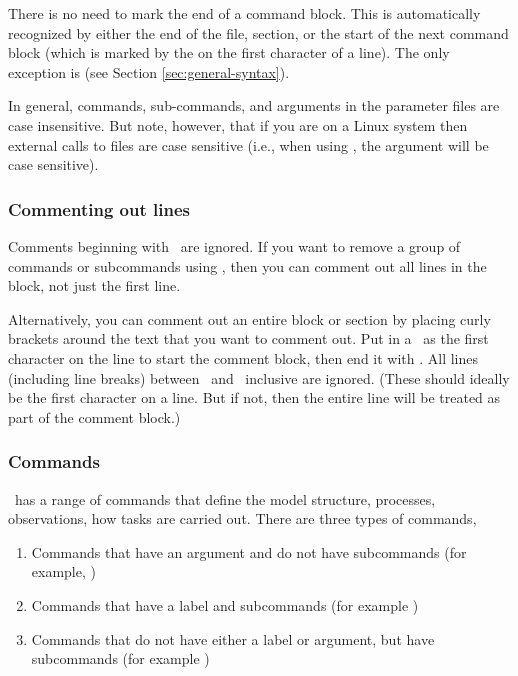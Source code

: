 There is no need to mark the end of a command block. This is automatically recognized by either the end of the file, section, or the start of the next command block (which is marked by the \command{} on the first character of a line). The only exception is  (see Section \ref{sec:general-syntax}). 

In general, commands, sub-commands, and arguments in the parameter files are case insensitive. But note, however, that if you are on a Linux system then external calls to files are case sensitive (i.e., when using  , the argument  will be case sensitive). 

\subsubsection{Commenting out lines}

Comments beginning with \commentline\ are ignored. If you want to remove a group of commands or subcommands using \commentline, then you can comment out all lines in the block, not just the first line. 

Alternatively, you can comment out an entire block or section by placing curly brackets around the text that you want to comment out. Put in a \commentstart\ as the first character on the line to start the comment block, then end it with \commentend. All lines (including line breaks) between \commentstart\ and \commentend\ inclusive are ignored. (These should ideally be the first character on a line. But if not, then the entire line will be treated as part of the comment block.)

\subsubsection{Commands}

\SPM\ has a range of commands that define the model structure, processes, observations, how tasks are carried out. There are three types of commands, 
\begin{enumerate}
\item Commands that have an argument and do not have subcommands (for example, )
\item Commands that have a label and subcommands (for example )
\item Commands that do not have either a label or argument, but have subcommands (for example )
\end{enumerate}

